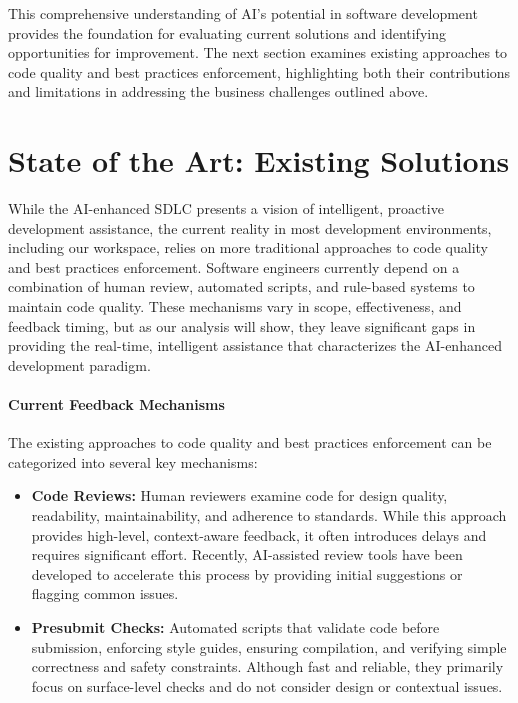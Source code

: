 \begin{spacing}{1.2}
This comprehensive understanding of AI's potential in software development provides the foundation for evaluating current solutions and identifying opportunities for improvement. The next section examines existing approaches to code quality and best practices enforcement, highlighting both their contributions and limitations in addressing the business challenges outlined above.

\section{State of the Art: Existing Solutions}

While the AI-enhanced SDLC presents a vision of intelligent, proactive development assistance, the current reality in most development environments, including our workspace, relies on more traditional approaches to code quality and best practices enforcement. Software engineers currently depend on a combination of human review, automated scripts, and rule-based systems to maintain code quality. These mechanisms vary in scope, effectiveness, and feedback timing, but as our analysis will show, they leave significant gaps in providing the real-time, intelligent assistance that characterizes the AI-enhanced development paradigm.

\paragraph{Current Feedback Mechanisms}
The existing approaches to code quality and best practices enforcement can be categorized into several key mechanisms:

\begin{itemize}
    \item \textbf{Code Reviews:} Human reviewers examine code for design quality, readability, maintainability, and adherence to standards. While this approach provides high-level, context-aware feedback, it often introduces delays and requires significant effort. Recently, AI-assisted review tools have been developed to accelerate this process by providing initial suggestions or flagging common issues.
    
    \item \textbf{Presubmit Checks:} Automated scripts that validate code before submission, enforcing style guides, ensuring compilation, and verifying simple correctness and safety constraints. Although fast and reliable, they primarily focus on surface-level checks and do not consider design or contextual issues.
    

\end{itemize}
\end{spacing}
